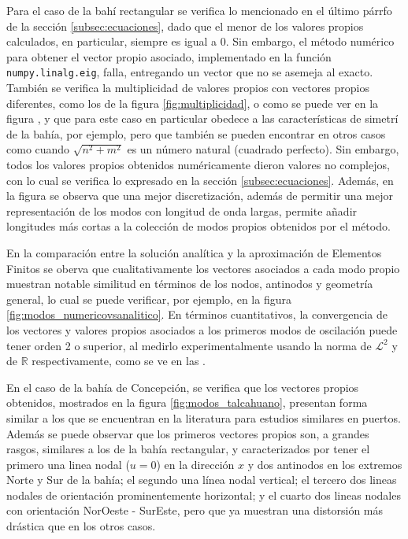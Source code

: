   Para el caso de la bah\'i rectangular se verifica lo mencionado en el \'ultimo p\'arrfo de la secci\'on \ref{subsec:ecuaciones}, dado que el menor de los valores propios calculados, en particular, siempre es igual a 0. Sin embargo, el m\'etodo num\'erico para obtener el vector propio asociado, implementado en la funci\'on \verb;numpy.linalg.eig;, falla, entregando un vector que no se asemeja al exacto. Tambi\'en se verifica la multiplicidad de valores propios con vectores propios diferentes, como los de la figura \ref{fig:multiplicidad}, o como se puede ver en la figura , y que para este caso en particular obedece a las caracter\'isticas de simetr\'i de la bah\'ia, por ejemplo, pero que tambi\'en se pueden encontrar en otros casos como cuando $\sqrt{n^2+m^2}$ es un n\'umero natural (cuadrado perfecto). Sin embargo, todos los valores propios obtenidos num\'ericamente dieron valores no complejos, con lo cual se verifica lo expresado en la secci\'on \ref{subsec:ecuaciones}\cite{nica2011}. Adem\'as, en la figura  se observa que una mejor discretizaci\'on, adem\'as de permitir una mejor representaci\'on de los modos con longitud de onda largas, permite a\~nadir longitudes m\'as cortas a la colecci\'on de modos propios obtenidos por el m\'etodo.
  
  En la comparaci\'on entre la soluci\'on anal\'itica y la aproximaci\'on de Elementos Finitos se oberva que cualitativamente los vectores asociados a cada modo propio muestran notable similitud en t\'erminos de los nodos, antinodos y geometr\'ia general, lo cual se puede verificar, por ejemplo, en la figura \ref{fig:modos_numericovsanalitico}. En t\'erminos cuantitativos, la convergencia de los vectores y valores propios asociados a los primeros modos de oscilaci\'on puede tener orden 2 o superior, al medirlo experimentalmente usando la norma de $\mathcal{L}^2$ y de $\mathbb{R}$ respectivamente, como se ve en las .
  
  
  En el caso de la bah\'ia de Concepci\'on, se verifica que los vectores propios obtenidos, mostrados en la figura \ref{fig:modos_talcahuano}, presentan forma similar a los que se encuentran en la literatura para estudios similares en puertos. Adem\'as se puede observar que los primeros vectores propios son, a grandes rasgos, similares a los de la bah\'ia rectangular, y caracterizados por tener el primero una linea nodal ($u=0$) en la direcci\'on $x$ y dos antinodos en los extremos Norte y Sur de la bah\'ia; el segundo una l\'inea nodal vertical; el tercero dos lineas nodales de orientaci\'on prominentemente horizontal; y el cuarto dos lineas nodales con orientaci\'on NorOeste - SurEste, pero que ya muestran una distorsi\'on m\'as dr\'astica que en los otros casos. 
  
